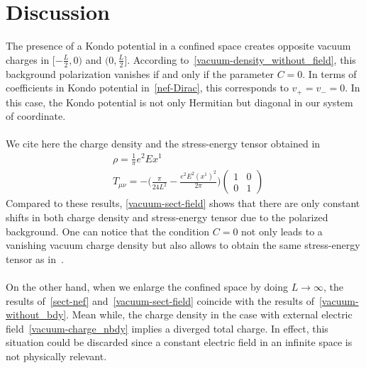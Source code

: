 \section{Discussion}
The presence of a Kondo potential in a confined space creates opposite vacuum charges in $[-\frac L 2, 0)$ and $(0, \frac L 2]$.
According to~\cref{vacuum-density_without_field}, 
this background polarization vanishes if and only if the parameter $C = 0$. 
In terms of coefficients in Kondo potential in~\cref{nef-Dirac},
this corresponds to $v_+ = v_- = 0$.
In this case, the Kondo potential is not only Hermitian but diagonal in our system of coordinate. \\\\
%
We cite here the charge density and the stress-energy tensor obtained in~\cite{Zahn2015}
\begin{equation*}
\begin{split}
& \rho = \frac 1 \pi e^2 Ex^1 \\
& T_{\mu\nu} = - \big( \frac{\pi}{24L^2} - \frac{e^2 E^2 (x^1)^2}{2\pi}\big) \begin{pmatrix} 1 & 0 \\ 0 & 1 \end{pmatrix}
\end{split}
\end{equation*}
Compared to these results, 
\cref{vacuum-sect-field} shows that there are only constant shifts in both charge density and stress-energy tensor due to the polarized background.
One can notice that the condition $C = 0$ not only leads to a vanishing vacuum charge density but also allows to obtain the same stress-energy tensor as in~\cite{Zahn2015}.
\\\\
On the other hand, when we enlarge the confined space by doing $L \rightarrow \infty$, 
the results of~\cref{sect-nef} and~\cref{vacuum-sect-field} coincide with the results of~\cref{vacuum-without_bdy}.
Mean while, the charge density in the case with external electric field~\cref{vacuum-charge_nbdy} implies a diverged total charge.
In effect, this situation could be discarded since a constant electric field in an infinite space is not physically relevant.































